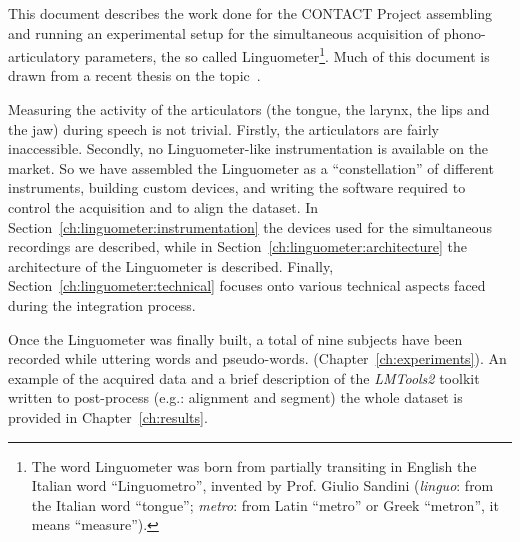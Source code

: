 This document
describes the work done for the 
CONTACT Project assembling and running an experimental setup for the 
simultaneous acquisition of phono-articulatory parameters, the so called 
Linguometer\footnote{The 
word Linguometer was born from partially transiting in English the Italian word
``Linguometro'', invented by Prof. Giulio Sandini
(\emph{linguo}: from the Italian word ``tongue''; \emph{metro}: from Latin 
``metro'' or Greek ``metron'', it means ``measure'').}.
Much of this document is drawn from a recent thesis on 
the topic~\cite{tavella2007simultaneous}.


Measuring the activity of the articulators (the tongue, the larynx, the lips and
the jaw) during speech is not trivial. 
Firstly, the articulators are fairly inaccessible.
Secondly, no Linguometer-like instrumentation is available on the market.
So we have assembled the Linguometer as a ``constellation'' of
different instruments, building custom devices, and 
writing the software required to control the acquisition and to align the
dataset.
In Section~\ref{ch:linguometer:instrumentation} the devices
used for the simultaneous recordings are described, while in 
Section~\ref{ch:linguometer:architecture} the architecture of
the Linguometer is described. Finally, Section~\ref{ch:linguometer:technical}
focuses onto various technical aspects faced during the integration
process.

Once the Linguometer was finally built, a total of nine
subjects have been recorded while uttering words and pseudo-words.
(Chapter~\ref{ch:experiments}).
An example of the acquired data and a brief description of the \emph{LMTools2}
toolkit written to post-process (e.g.: alignment and segment)
the whole dataset is provided in Chapter~\ref{ch:results}.

\pagebreak
